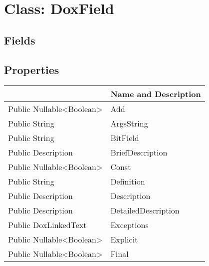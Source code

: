 \documentclass[11pt, oneside, a4paper]{book}
\begin{document}
\hypertarget{SoftwareEngineeringTools.{}Documentation.{}DoxField}{}
\section{Class: DoxField}

\subsection{Fields}

\subsection{Properties}
\begin{center}
\begin{tabular}{| p{3cm} | p{12cm} | }
\hline
\textbf{ } & \textbf{ Name and Description}\\
\hline
 Public  Nullable<Boolean> &  Add\hypertarget{SoftwareEngineeringTools.{}Documentation.{}DoxField.{}Add}{}\\
\hline
 Public  String &  ArgsString\hypertarget{SoftwareEngineeringTools.{}Documentation.{}DoxField.{}ArgsString}{}\\
\hline
 Public  String &  BitField\hypertarget{SoftwareEngineeringTools.{}Documentation.{}DoxField.{}BitField}{}\\
\hline
 Public  Description &  BriefDescription\hypertarget{SoftwareEngineeringTools.{}Documentation.{}DoxField.{}BriefDescription}{}\\
\hline
 Public  Nullable<Boolean> &  Const\hypertarget{SoftwareEngineeringTools.{}Documentation.{}DoxField.{}Const}{}\\
\hline
 Public  String &  Definition\hypertarget{SoftwareEngineeringTools.{}Documentation.{}DoxField.{}Definition}{}\\
\hline
 Public  Description &  Description\hypertarget{SoftwareEngineeringTools.{}Documentation.{}DoxField.{}Description}{}\\
\hline
 Public  Description &  DetailedDescription\hypertarget{SoftwareEngineeringTools.{}Documentation.{}DoxField.{}DetailedDescription}{}\\
\hline
 Public  DoxLinkedText &  Exceptions\hypertarget{SoftwareEngineeringTools.{}Documentation.{}DoxField.{}Exceptions}{}\\
\hline
 Public  Nullable<Boolean> &  Explicit\hypertarget{SoftwareEngineeringTools.{}Documentation.{}DoxField.{}Explicit}{}\\
\hline
 Public  Nullable<Boolean> &  Final\hypertarget{SoftwareEngineeringTools.{}Documentation.{}DoxField.{}Final}{}\\

\end{tabular}
\end{center}
\end{document}
